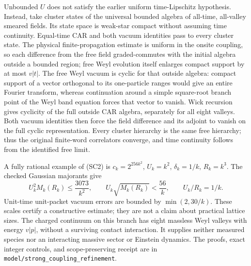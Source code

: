 Unbounded $U$ does not satisfy the earlier uniform time-Lipschitz
hypothesis. Instead, take cluster states of the universal bounded
algebra of all-time, all-valley smeared fields. Its state space is
weak-star compact without assuming time continuity. Equal-time CAR
and both vacuum identities pass to every cluster state. The physical
finite-propagation estimate is uniform in the onsite coupling, so
each difference from the free field graded-commutes with the initial
algebra outside a bounded region; free Weyl evolution itself enlarges
compact support by at most $v|t|$. The free Weyl vacuum is cyclic for
that outside algebra: compact support of a vector orthogonal to its
one-particle ranges would give an entire Fourier transform, whereas
continuation around a simple square-root branch point of the Weyl
band equation forces that vector to vanish. Wick recursion gives
cyclicity of the full outside CAR algebra, separately for all eight
valleys. Both vacuum identities then force the field difference and
its adjoint to vanish on the full cyclic representation. Every
cluster hierarchy is the same free hierarchy; thus the original
finite-word correlators converge, and time continuity follows from
the identified free limit.

A fully rational example of (SC2) is
$c_k=2^{256k^2}$, $U_k=k^2$, $\delta_k=1/k$, $R_k=k^3$.
The checked Gaussian majorants give
\[
 U_k^2 M_k(R_k)\leq\frac{3073}{k^2},\qquad
 U_k\sqrt{M_k(R_k)}<\frac{56}{k},\qquad U_k/R_k=1/k.
\]
Unit-time unit-packet vacuum errors are bounded by $\min(2,30/k)$.
These scales certify a constructive estimate; they are not a claim
about practical lattice sizes. The charged continuum on this branch
has eight massless Weyl valleys with energy $v|p|$, without a surviving
contact interaction. It supplies neither measured species nor an
interacting massive sector or Einstein dynamics. The proofs, exact
integer controls, and scope-preserving receipt are in
\texttt{model/strong\_coupling\_refinement}.
